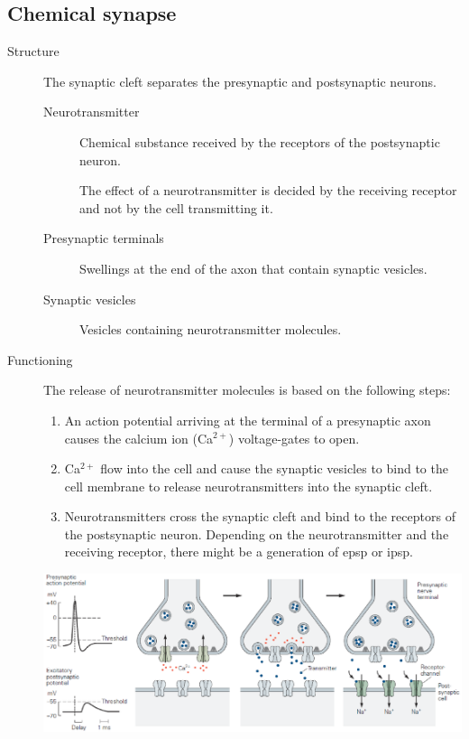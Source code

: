 \subsection{Chemical synapse}

\begin{description}
    \item[Structure] 
        The synaptic cleft separates the presynaptic and postsynaptic neurons.
        \begin{description}
            \item[Neurotransmitter] 
                Chemical substance received by the receptors of the postsynaptic neuron.

                The effect of a neurotransmitter is decided by the receiving receptor and not by the cell transmitting it.

            \item[Presynaptic terminals] 
                Swellings at the end of the axon that contain synaptic vesicles.

            \item[Synaptic vesicles] 
                Vesicles containing neurotransmitter molecules.
        \end{description}

    \item[Functioning] 
        The release of neurotransmitter molecules is based on the following steps:
        \begin{enumerate}
            \item An action potential arriving at the terminal of a presynaptic axon causes the calcium ion (Ca$^{2+}$) voltage-gates to open.
            \item Ca$^{2+}$ flow into the cell and 
                cause the synaptic vesicles to bind to the cell membrane to release neurotransmitters into the synaptic cleft.
            \item Neurotransmitters cross the synaptic cleft and bind to the receptors of the postsynaptic neuron.
                Depending on the neurotransmitter and the receiving receptor, there might be a generation of \ac{epsp} or \ac{ipsp}.
        \end{enumerate}

        \begin{center}
            \includegraphics[width=0.9\linewidth]{./img/chemical_synapse.png}
        \end{center}


\end{description}
